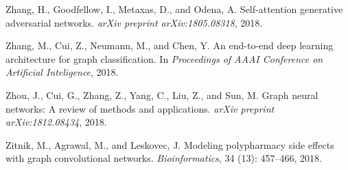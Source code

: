 \documentclass{article}
\begin{document}
\begin{thebibliography}{57}
Zhang, H., Goodfellow, I., Metaxas, D., and Odena, A.
\newblock Self-attention generative adversarial networks.
\newblock \emph{arXiv preprint arXiv:1805.08318}, 2018{}.

Zhang, M., Cui, Z., Neumann, M., and Chen, Y.
\newblock An end-to-end deep learning architecture for graph classification.
\newblock In \emph{Proceedings of AAAI Conference on Artificial Inteligence},
  2018{}.

Zhou, J., Cui, G., Zhang, Z., Yang, C., Liu, Z., and Sun, M.
\newblock Graph neural networks: A review of methods and applications.
\newblock \emph{arXiv preprint arXiv:1812.08434}, 2018.

Zitnik, M., Agrawal, M., and Leskovec, J.
\newblock Modeling polypharmacy side effects with graph convolutional networks.
\newblock \emph{Bioinformatics}, 34 (13): 457–466, 2018.

\end{thebibliography}



\end{document}
